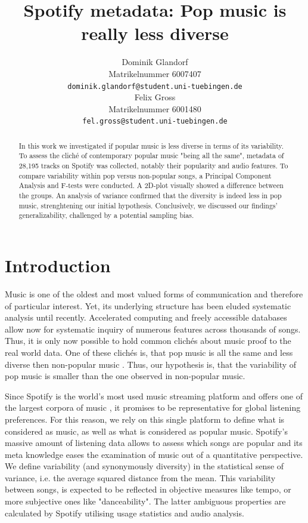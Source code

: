 \documentclass{article}
\title{Spotify metadata: Pop music is really less diverse}
\author{%
  Dominik Glandorf\\
  Matrikelnummer 6007407\\
  \texttt{dominik.glandorf@student.uni-tuebingen.de} \\
  \And
  Felix Gross\\
  Matrikelnummer 6001480\\
  \texttt{fel.gross@student.uni-tuebingen.de} \\
}
\begin{document}
\maketitle

\begin{abstract}
In this work we investigated if popular music is less diverse in terms of its variability.
To assess the cliché of contemporary popular music "being all the same",
metadata of 28,195 tracks on Spotify was collected, notably their popularity and audio features. To compare variability within pop versus non-popular songs, a Principal Component Analysis and F-tests were conducted.
A 2D-plot visually showed a difference between the groups. An analysis of variance confirmed that the diversity is indeed less in pop music, strenghtening our initial hypothesis.
Conclusively, we discussed our findings' generalizability, challenged by a potential sampling bias. 
\end{abstract}

\section{Introduction}
Music is one of the oldest and most valued forms of communication and therefore of particular interest. Yet, its underlying structure has been eluded systematic analysis until recently.
Accelerated computing and freely accessible databases allow now for systematic inquiry of numerous features across thousands of songs. Thus, it is only now possible to hold common clichés about music proof to the real world data.
One of these clichés is, that pop music is all the same and less diverse then non-popular music \citep{serra2012measuring}. Thus, our hypothesis is, that the variability of pop music is smaller than the one observed in non-popular music.

Since Spotify is the world's most used music streaming platform and offers one of the largest corpora of music \citep{quarterlyReport}, it promises to be representative for global listening preferences. For this reason, we rely on this single platform to define what is considered as music, as well as what is considered as popular music. Spotify's massive amount of listening data allows to assess which songs are popular and its meta knowledge eases the examination of music out of a quantitative perspective.
We define variability (and synonymously diversity) in the statistical sense of variance, i.e. the average squared distance from the mean. This variability between songs, is expected to be reflected in objective measures like tempo, or more subjective ones like "danceability".  The latter ambiguous properties are calculated by Spotify utilising usage statistics and audio analysis.
\end{document}
